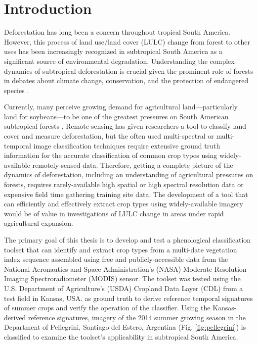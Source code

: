 \chapter{Introduction}

Deforestation has long been a concern throughout tropical South America. However, this process of land use/land cover (LULC) change from forest to other uses has been increasingly recognized in subtropical South America as a significant source of environmental degradation. Understanding the complex dynamics of subtropical deforestation is crucial given the prominent role of forests in debates about climate change, conservation, and the protection of endangered species \autocites{geist2002proximate}{zak2004do-subtropical}{bonnie2000counting}{houghton1994the-worldwide}{sala2000global}.

Currently, many perceive growing demand for agricultural land---particularly land for soybeans---to be one of the greatest pressures on South American subtropical forests \autocites{pengue2005transgenic}{grau2005agriculture}{altieri2006gm-soybean:}. Remote sensing has given researchers a tool to classify land cover and measure deforestation, but the often used multi-spectral or multi-temporal image classification techniques require extensive ground truth information for the accurate classification of common crop types using widely-available remotely-sensed data. Therefore, getting a complete picture of the dynamics of deforestation, including an understanding of agricultural pressures on forests, requires rarely-available high spatial or high spectral resolution data \autocite{senay2000using} or expensive field time gathering training site data. The development of a tool that can efficiently and effectively extract crop types using widely-available imagery would be of value in investigations of LULC change in areas under rapid agricultural expansion.

The primary goal of this thesis is to develop and test a phenological classification toolset that can identify and extract crop types from a multi-date vegetation index sequence assembled using free and publicly-accessible data from the National Aeronautics and Space Administration’s (NASA) Moderate Resolution Imaging Spectroradiometer (MODIS) sensor. The toolset was tested using the U.S. Department of Agriculture's (USDA) Cropland Data Layer (CDL) from a test field in Kansas, USA. as ground truth to derive reference temporal signatures of summer crops and verify the operation of the classifier. Using the Kansas-derived reference signatures, imagery of the 2014 summer growing season in the Department of Pellegrini, Santiago del Estero, Argentina (Fig. \ref{fig:pellegrini}) is classified to examine the toolset's applicability in subtropical South America.

